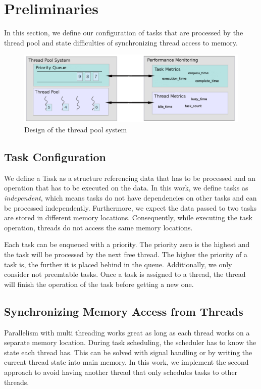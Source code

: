 \documentclass[conference]{IEEEtran}
\begin{document}
\section{Preliminaries}
In this section, we define our configuration of tasks that are processed by the thread pool and state difficulties of synchronizing thread access to memory.

\begin{figure}[htbp]
	\includegraphics[width=1.0\textwidth]{img/pool_structure.png}
	\caption{Design of the thread pool system}
	\label{fig0}
\end{figure}

\subsection{Task Configuration}
We define a Task as a structure referencing data that has to be processed and an operation that has to be executed on the data. In this work, we define tasks as \emph{independent}, which means tasks do not have dependencies on other tasks and can be processed independently. Furthermore, we expect the data passed to two tasks are stored in different memory locations. Consequently, while executing the task operation, threads do not access the same memory locations.

Each task can be enqueued with a priority. The priority zero is the highest and the task will be processed by the next free thread. The higher the priority of a task is, the further it is placed behind in the queue. Additionally, we only consider not preemtable tasks. Once a task is assigned to a thread, the thread will finish the operation of the task before getting a new one.

\subsection{Synchronizing Memory Access from Threads}
Parallelism with multi threading works great as long as each thread works on a separate memory location. During task scheduling, the scheduler has to know the state each thread has. This can be solved with signal handling or by writing the current thread state into main memory. In this work, we implement the second approach to avoid having another thread that only schedules tasks to other threads.
\end{document}
